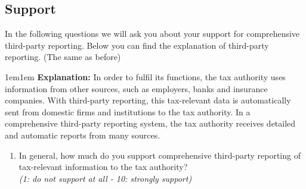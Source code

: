 \documentclass[11pt]{article}
\begin{document}
\subsection*{Support}
 \noindent In the following questions we will ask you about your support for comprehensive third-party reporting. Below you can find the explanation of third-party reporting. (The same as before) \\

\begin{adjustwidth}{1em}{1em}  \textbf{Explanation:} In order to fulfil its functions, the tax authority uses information from other sources, such as employers, banks and insurance companies. With third-party reporting, this tax-relevant data is automatically sent from domestic firms and institutions to the tax authority. In a comprehensive third-party reporting system, the tax authority receives detailed and automatic reports from many sources.
\end{adjustwidth}
\begin{enumerate}[resume]
    \item In general, how much do you support comprehensive third-party reporting of tax-relevant information to the tax authority?  \\ \textit{(1: do not support at all - 10: strongly support)}
\end{enumerate}
\end{document}
